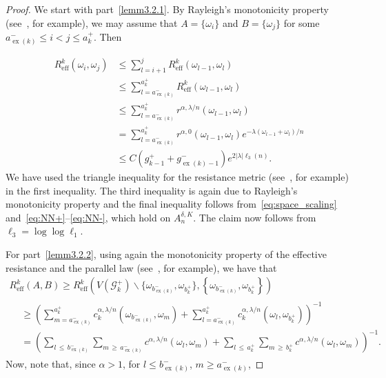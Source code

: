 \documentclass[10pt]{amsart}
\theoremstyle{definition}\newtheorem{defi}[theo]{Definition}\newtheorem{rema}[theo]{Remark}\newtheorem{exam}[theo]{Example}\newtheorem{exem}[theo]{Example}\newtheorem{nota}[theo]{Notation}
\newcommand{\clG}{\mathcal{G}}
\newcommand{\eff}{\mathrm{eff}}
\newcommand\ex{\operatorname{ex}}
\newcommand{\aat}[1]{a_{\ex(#1)}^-}
\newcommand{\bt}[1]{b_{\ex(#1)}^-}
\newcommand{\gtt}[1]{g_{\ex(#1)-1}^-}
\begin{document}
\begin{proof}
We start with part~\eqref{lemm3.2.1}. By Rayleigh's monotonicity property (see~\cite[Section~1.4.1]{DS}, for example), we may assume that $A=\{\omega_i\}$ and $B=\{\omega_j\}$ for some $\aat{k}\leq i<j\leq a_k^+$. Then

\begin{align*}
{R}^k_\eff\left(\omega_i,\omega_j\right)&\leq {\textstyle \sum_{l=i+1}^{j}}{R}^k_\eff\left(\omega_{l-1},\omega_{l}\right)\\
&\leq {\textstyle \sum_{l=\aat{k}}^{a_k^+}}{R}^k_\eff\left(\omega_{l-1},\omega_{l}\right)\\
&\leq {\textstyle \sum_{l=\aat{k}}^{a_k^+}}r^{\alpha,\lambda/n}\left(\omega_{l-1},\omega_l\right)\\
&={\textstyle \sum_{l=\aat{k}}^{a_k^+}}r^{\alpha,0}\left(\omega_{l-1},\omega_l\right)e^{-\lambda\left(\omega_{l-1}+\omega_l\right)/n}\\
&\leq C\left(g_{k-1}^++\gtt{k}\right)e^{2|\lambda| \ell_3(n)}.
\end{align*}
We have used the triangle inequality for the resistance metric (see~\cite[Theorem~2.64]{Barbook}, for example) in the first inequality. The third inequality is again due to Rayleigh's monotonicity property and the final inequality follows from~\eqref{eq:space_scaling} and~\eqref{eq:NN+}--\eqref{eq:NN-}, which hold on $A_n^{\delta,K}$. The claim now follows from $\ell_3=\log\log \ell_1$.

For part~\eqref{lemm3.2.2}, using again the monotonicity property of the effective resistance and the parallel law (see~\cite[Remark~2.52]{Barbook}, for example), we have that
\begin{multline}\label{eq:Reff0bb}
{R}^k_\eff(A,B)
\geq {{R}^k_\eff\left(V\left(\clG_k^+\right)\backslash\{\omega_{\bt{k}},\omega_{{b}_k^+}\},\left\{\omega_{\bt{k}},\omega_{{b}_k^+}\right\}\right)}\\
\begin{aligned}
&\geq \left({\textstyle \sum_{m=\aat{k}}^{a_k^+}}c^{\alpha,\lambda/n}_k\left(\omega_{\bt{k}},\omega_m\right)+ {\textstyle \sum_{l=\aat{k}}^{a_k^+}}c^{\alpha,\lambda/n}_k\left(\omega_l,\omega_{b_k^+}\right)\right)^{-1}\\
&=\left({\textstyle \sum_{l\,\leq\, \bt{k}}\sum_{m\,\geq\,\aat{k}}}c^{\alpha,\lambda/n}\left(\omega_l,\omega_m\right)+ {\textstyle \sum_{l\,\leq\,a_k^+}\sum_{m\,\geq\,b_k^+}}c^{\alpha,\lambda/n}\left(\omega_l,\omega_m\right)\right)^{-1}.
\end{aligned}
\end{multline}
Now, note that, since $\alpha>1$, for $l\leq\bt{k}$, $m\geq \aat{k}$,


\end{proof}
\end{document}
